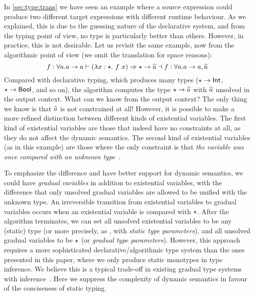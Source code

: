 In \cref{sec:type:trans} we have seen an example where a source expression could
produce two different target expressions with different runtime behaviour. As we
explained, this is due to the guessing nature of the declarative system, and
from the typing point of view, no type is particularly better than others.
However, in practice, this is not desirable. Let us revisit the same example, now
from the algorithmic point of view (we omit the translation for space reasons):
\[
  f: \forall a. a \to a \vdash (\lambda x:\star.~ {f ~ x}) \Rightarrow \star \to \widehat{a} \dashv f : \forall a. a \to a, \widehat{a}
\]
Compared with declarative typing, which produces many types
($\star \to \mathsf{Int}$, $\star \to \mathsf{Bool}$, and so on), the algorithm computes
the type $\star \to \widehat{a}$ with $\widehat{a}$ unsolved in the output context.
What can we know from the output context? The only thing we know is that $\widehat{a}$
is not constrained at all! However, it is possible to make a more refined distinction
between different kinds of existential variables. The first
kind of existential variables are those that indeed have no constraints at all,
as they do not affect the dynamic semantics. The second kind of existential
variables (as in this example) are those where the only constraint is that
\textit{the variable was once compared with an unknown type}~\citep{garcia2015principal}.

To emphasize the difference and have better support for dynamic semantics, we
could have \textit{gradual variables} in addition to existential variables, with
the difference that only unsolved gradual variables are allowed to be unified
with the
unknown type. An irreversible transition from existential variables to
gradual variables occurs when an existential variable is compared with
$\star$. After the algorithm terminates, we can set all unsolved existential
variables to be any (static) type (or more precisely, as \citet{garcia2015principal}, with
\textit{static type parameters}), and all unsolved gradual variables to be
$\star$ (or \textit{gradual type parameters}).
However, this approach requires a more sophisticated declarative/algorithmic type system than the
ones presented in this paper, where we only produce static
monotypes in type inference. We believe this is a typical trade-off in existing
gradual type systems with inference~\citep{siek2008gradual,
  garcia2015principal}. Here we suppress the complexity of dynamic semantics
in favour of the conciseness of static typing.


